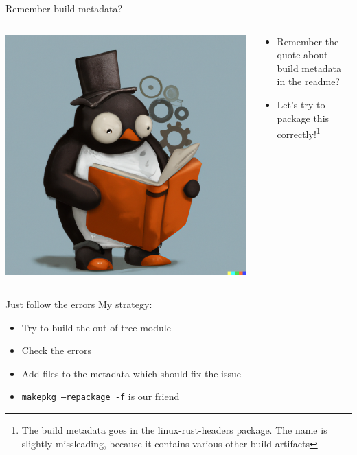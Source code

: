 \begin{frame}[c]{Remember build metadata?}
  \begin{columns}[c]
    \begin{column}{0.5\textwidth}
      \includegraphics[width=\textwidth]{img/tux-trying-to-remember-what-he-read-in-the-readme.png}
    \end{column}
    \begin{column}{0.5\textwidth}
      \begin{itemize}
        \item Remember the quote about build metadata in the readme?
        \item Let's try to package this correctly!\footnote{The build metadata goes in the linux-rust-headers package. The name is slightly missleading, because it contains various other build artifacts}
      \end{itemize}
    \end{column}
  \end{columns}
\end{frame}

\begin{frame}[c]{Just follow the errors}
My strategy:
  \begin{itemize}
    \item Try to build the out-of-tree module
    \item Check the errors
    \item Add files to the metadata which should fix the issue
    \item \texttt{makepkg --repackage -f} is our friend
  \end{itemize}
\end{frame}

